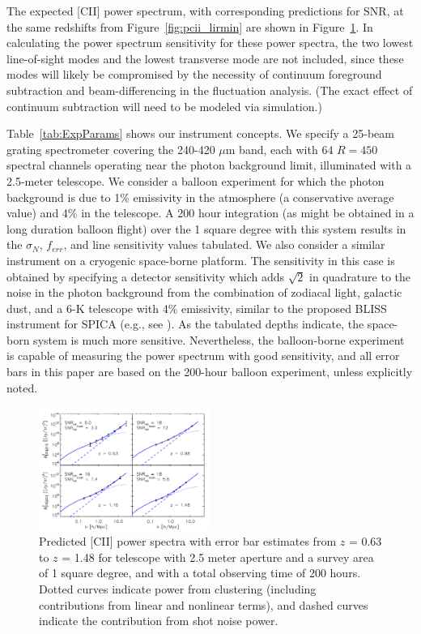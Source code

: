 \documentclass[iop]{emulateapj}
\begin{document}
The expected [CII] power spectrum, with corresponding predictions for SNR, at the same redshifts from Figure~\ref{fig:pcii_lirmin} are shown in Figure~\ref{fig:pcii_zall}. In calculating the power spectrum sensitivity for these power spectra, the two lowest line-of-sight modes and the lowest transverse mode are not included, since these modes will likely be compromised by the necessity of continuum foreground subtraction and beam-differencing in the fluctuation analysis. (The exact effect of continuum subtraction will need to be modeled via simulation.)

Table~\ref{tab:ExpParams} shows our instrument concepts.  We specify a 25-beam grating spectrometer covering the 240-420 $\mu$m band, each with 64 $R=450$ spectral channels operating near the photon background limit, illuminated with a 2.5-meter telescope. We consider a balloon experiment for which the photon background is due to 1\% emissivity in the atmosphere (a conservative average value) and 4\% in the telescope. A 200 hour integration (as might be obtained in a long duration balloon flight) over the 1 square degree with this system results in the $\sigma_N$, $f_{err}$, and line sensitivity values tabulated. We also consider a similar instrument on a cryogenic space-borne platform. The sensitivity in this case is obtained by specifying a detector sensitivity which adds $\sqrt{2}$ in quadrature to the noise in the photon background from the combination of zodiacal light, galactic dust, and a 6-K telescope with 4\% emissivity, similar to the proposed BLISS instrument for SPICA (e.g., see \citet{bradford12}). As the tabulated depths indicate, the space-born system is much more sensitive. Nevertheless, the balloon-borne experiment is capable of measuring the power spectrum with good sensitivity, and all error bars in this paper are based on the 200-hour balloon experiment, unless explicitly noted. 

\begin{figure}[t]
\centering
\includegraphics[width = 0.5\textwidth]{pcii_STARFIRE_z63_z88_z116_z148_halofit_bethermin_spinoglio_ap2p5m_1sqdeg_uhp_ktnonzero_minimaltext}
\caption{Predicted [CII] power spectra with error bar estimates from $z$ = 0.63 to $z$ = 1.48 for telescope with 2.5 meter aperture and a survey area of 1 square degree, and with a total observing time of 200 hours. Dotted curves indicate power from clustering (including contributions from linear and nonlinear terms), and dashed curves indicate the contribution from shot noise power.}
\label{fig:pcii_zall}
\end{figure}
\end{document}
